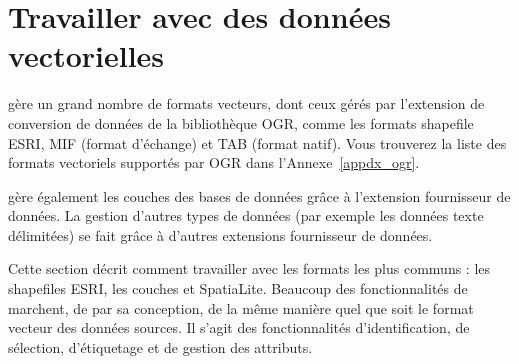 
\chapter{Travailler avec des données vectorielles}\label{label_workingvector}

\qg gère un grand nombre de formats vecteurs, dont ceux gérés par l'extension de conversion de données de la bibliothèque OGR, comme les formats shapefile ESRI, \map MIF (format d'échange) et  \map TAB (format natif).
Vous trouverez la liste des formats vectoriels supportés par OGR dans l'Annexe~\ref{appdx_ogr}.

\qg gère également les couches \pg {} des bases de données \psq grâce à l'extension \og fournisseur de données\fg \psq. La gestion d'autres types de données (par exemple les données texte délimitées) se fait grâce à d'autres extensions \og fournisseur de données\fg.

Cette section décrit comment travailler avec les formats les plus communs : les shapefiles ESRI, les couches \pg et SpatiaLite. Beaucoup des fonctionnalités de \qg marchent, de par sa conception, de la même manière quel que soit le format vecteur des données sources. Il s'agit des fonctionnalités d'identification, de sélection, d'étiquetage et de gestion des attributs.

